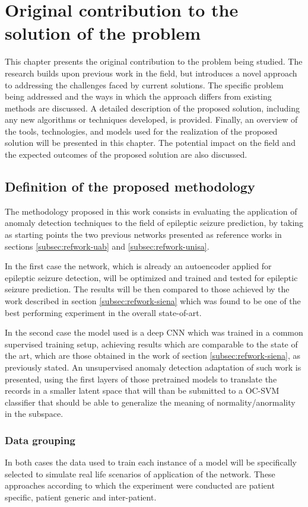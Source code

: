 \chapter{Original contribution to the solution of the problem}
This chapter presents the original contribution to the problem being studied. The research builds upon previous work in the field, but introduces a novel approach to addressing the challenges faced by current solutions. The specific problem being addressed and the ways in which the approach differs from existing methods are discussed. A detailed description of the proposed solution, including any new algorithms or techniques developed, is provided. Finally, an overview of the tools, technologies, and models used for the realization of the proposed solution will be presented in this chapter. The potential impact on the field and the expected outcomes of the proposed solution are also discussed.

\section{Definition of the proposed methodology}
The methodology proposed in this work consists in evaluating the application of anomaly detection techniques to the field of epileptic seizure prediction, by taking as starting points the two previous networks presented as reference works in sections \ref{subsec:refwork-uab} and \ref{subsec:refwork-unisa}.

In the first case the network, which is already an autoencoder applied for epileptic seizure detection, will be optimized and trained and tested for epileptic seizure prediction. The results will be then compared to those achieved by the work described in section \ref{subsec:refwork-siena} which was found to be one of the best performing experiment in the overall state-of-art.

In the second case the model used is a deep \gls{CNN} which was trained in a common supervised training setup, achieving results which are comparable to the state of the art, which are those obtained in the work of section \ref{subsec:refwork-siena}, as previously stated. An unsupervised anomaly detection adaptation of such work is presented, using the first layers of those pretrained models to translate the records in a smaller latent space that will than be submitted to a \gls{OC-SVM} classifier that should be able to generalize the meaning of normality/anormality in the subspace.

\subsection{Data grouping} \label{subsec:data-grouping}
In both cases the data used to train each instance of a model will be specifically selected to simulate real life scenarios of application of the network. These approaches according to which the experiment were conducted are patient specific, patient generic and inter-patient.

